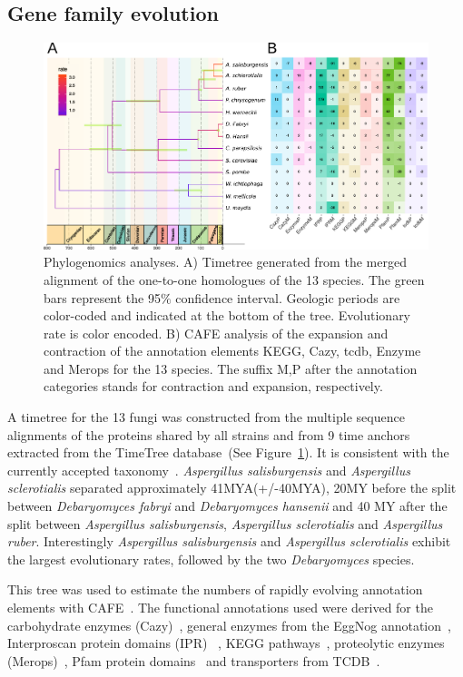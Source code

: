 \documentclass[jof,article,submit,moreauthors,pdftex,10pt,a4paper]{Definitions/mdpi}
\newcommand{\aspRub}{\textit{Aspergillus ruber}}
\newcommand{\debFab}{\textit{Debaryomyces fabryi}}
\newcommand{\debHan}{\textit{Debaryomyces hansenii}}
\newcommand{\phiSp}{\textit{Aspergillus salisburgensis}}
\newcommand{\phiScl}{\textit{Aspergillus sclerotialis}}
\begin{document}
\subsection{Gene family evolution}

\begin{figure}[htbp]
  \centering
  \includegraphics[width=\linewidth]{./geophyloTreeCAFE.pdf}
  \caption{\label{fig:gainLossTree} Phylogenomics analyses. A) Timetree generated from the merged alignment of the one-to-one homologues of the 13 species. The green bars represent the 95$\%$ confidence interval. Geologic periods are color-coded and  indicated at the bottom of the tree. Evolutionary rate is color encoded. B) CAFE analysis of the expansion and contraction of the annotation elements KEGG, Cazy, tcdb, Enzyme and Merops for the 13 species. The suffix M,P after the annotation categories stands for contraction and expansion, respectively.}
\end{figure}


A timetree for the 13 fungi was constructed from the multiple sequence alignments of the proteins shared by all strains and from 9 time anchors extracted from the TimeTree database~\cite{Kumar2017}(See Figure~\ref{fig:gainLossTree}). It is consistent with the currently accepted taxonomy~\cite{Kumar2017}. \phiSp{} and \phiScl{} separated approximately 41MYA(+/-40MYA), 20MY before the split between \debFab{} and \debHan{} and 40 MY after the split between \phiSp{}, \phiScl{} and \aspRub{}. Interestingly \phiSp{} and \phiScl{} exhibit the largest evolutionary rates, followed by the two \textit{Debaryomyces} species. 

This tree was used to estimate the numbers of rapidly evolving annotation elements with CAFE~\cite{DeBie2006}. The functional annotations used were derived for the carbohydrate enzymes (Cazy)~\cite{Cantarel2009}, general enzymes from the EggNog annotation~\cite{HuertaCepas2016}, Interproscan protein domains (IPR) ~\cite{Jones2014a}, KEGG pathways~\cite{Ogata1999}, proteolytic enzymes (Merops)~\cite{Rawlings2014}, Pfam protein domains~\cite{Finn2014a} and transporters from TCDB~\cite{Saier2006}. 
\end{document}
